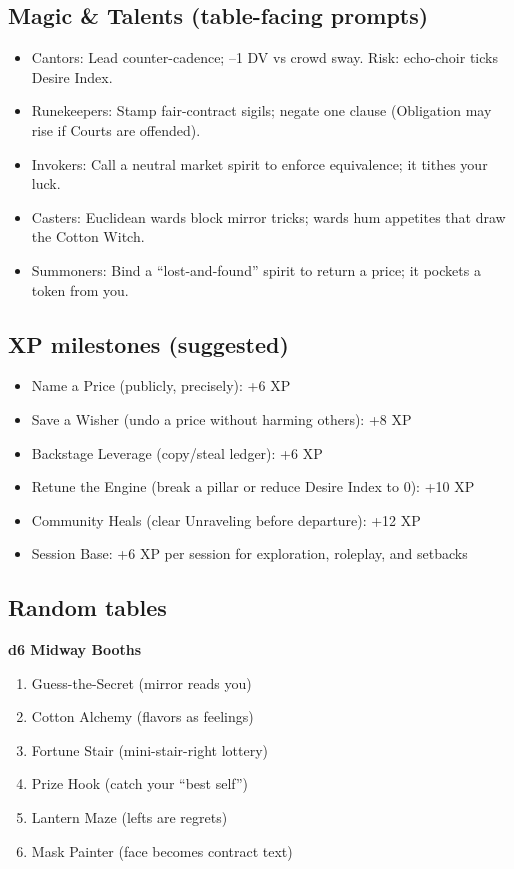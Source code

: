 \documentclass[11pt]{article}
\newcommand{\divider}{\vspace{12pt}\noindent\makebox[\linewidth]{\rule{\textwidth}{0.4pt}}\vspace{12pt}}
\begin{document}
\divider

\subsection*{Magic \& Talents (table-facing prompts)}
\begin{itemize}
\item Cantors: Lead counter-cadence; --1 DV vs crowd sway. Risk: echo-choir ticks Desire Index.
\item Runekeepers: Stamp fair-contract sigils; negate one clause (Obligation may rise if Courts are offended).
\item Invokers: Call a neutral market spirit to enforce equivalence; it tithes your luck.
\item Casters: Euclidean wards block mirror tricks; wards hum appetites that draw the Cotton Witch.
\item Summoners: Bind a ``lost-and-found'' spirit to return a price; it pockets a token from you.
\end{itemize}

\divider

\subsection*{XP milestones (suggested)}
\begin{itemize}
\item Name a Price (publicly, precisely): +6 XP
\item Save a Wisher (undo a price without harming others): +8 XP
\item Backstage Leverage (copy/steal ledger): +6 XP
\item Retune the Engine (break a pillar or reduce Desire Index to 0): +10 XP
\item Community Heals (clear Unraveling before departure): +12 XP
\item Session Base: +6 XP per session for exploration, roleplay, and setbacks
\end{itemize}

\divider

\subsection*{Random tables}

\textbf{d6 Midway Booths}
\begin{enumerate}
\item Guess-the-Secret (mirror reads you)
\item Cotton Alchemy (flavors as feelings)
\item Fortune Stair (mini-stair-right lottery)
\item Prize Hook (catch your ``best self'')
\item Lantern Maze (lefts are regrets)
\item Mask Painter (face becomes contract text)
\end{enumerate}
\end{document}

